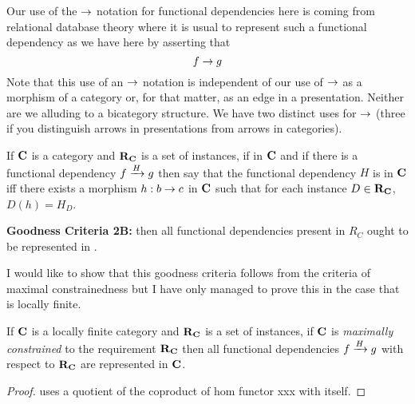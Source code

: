 \documentclass[xcolor=pst,dvips]{beamer}
\begin{document}
\begin{frame}
Our use of the $\morph$ notation for functional dependencies here is coming from relational database theory where it is usual to represent such a functional dependency as we have here by asserting that 
$$
f \morph g
$$
Note that this use of an $\morph$ notation is independent of our use of $\morph$ as a morphism of a category 
or, for that matter, as an edge in a presentation. Neither are we alluding to a bicategory structure. We have two distinct uses for $\morph$ (three if you distinguish arrows in presentations from arrows in categories). 
\end{frame}


\begin{frame}
\begin{definition}
If $\catc$ is a category and $\reqtc$ is a set of instances, if
\fgsourcediagram
in $\catc$ 
and if there is a functional dependency $\fundep{H}{f}{g}$ then say that 
the functional dependency $H$ is  in $\catc$ 
iff there exists a morphism $h:b \morph c$ in $\catc$ such that for each instance $D \in \reqtc$, $D(h)=H_D$.
\end{definition}
\end{frame}

\begin{frame}
\textbf {Goodness Criteria 2B:} \IfSforCwithRCwords then all functional dependencies present in $R_C$
ought to be represented in \catc.

I would like to show that this goodness criteria follows from the criteria of maximal constrainedness
but I have only managed to prove this in the case that \catcw is locally finite.
\end{frame}

\begin{frame}
\begin{lemma}
If $\catc$ is a locally finite category and $\reqtc$ is a set of instances, if $\catc$ is 
\textit{maximally constrained} to the requirement $\reqtc$ then
all functional dependencies $\fundep{H}{f}{g}$  with respect to $\reqtc$ are represented in $\catc$.
\end{lemma}
\begin{proof}
uses a quotient of the coproduct of hom functor xxx with itself.
\end{proof}
\end{frame}
\end{document}
